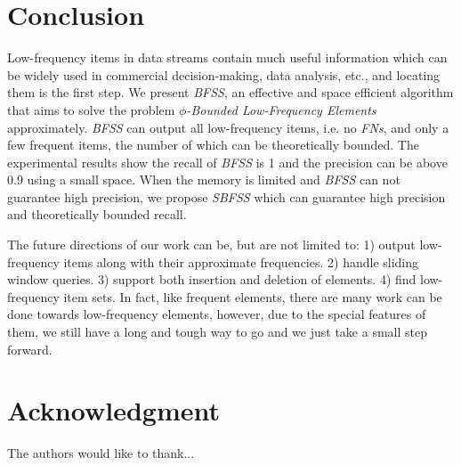 \documentclass[conference]{IEEEtran}
\begin{document}
\section{Conclusion}
Low-frequency items in data streams contain much useful information which can be widely used in commercial decision-making, data analysis, etc., and locating them is the first step. We present \emph{BFSS}, an effective and space efficient algorithm that aims to solve the problem \emph{$\phi$-Bounded Low-Frequency Elements} approximately. \emph{BFSS} can output all low-frequency items, i.e. no \emph{FNs}, and only a few frequent items, the number of which can be theoretically bounded. The experimental results show the recall of \emph{BFSS} is 1 and the precision can be above 0.9 using a small space. When the memory is limited and \emph{BFSS} can not guarantee high precision, we propose \emph{SBFSS} which can guarantee high precision and theoretically bounded recall. \par
The future directions of our work can be, but are not limited to: 1) output low-frequency items along with their approximate frequencies. 2) handle sliding window queries. 3) support both insertion and deletion of elements. 4) find low-frequency item sets. In fact, like frequent elements, there are many work can be done towards low-frequency elements, however, due to the special features of them, we still have a long and tough way to go and we just take a small step forward.








\section*{Acknowledgment}


The authors would like to thank...







%
%
%









\end{document}

